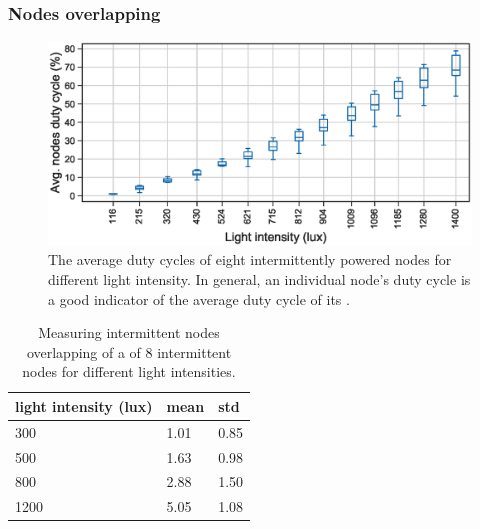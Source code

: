 \subsubsection{Nodes overlapping}
\begin{figure}[t]
		\centering
		\includegraphics[width=\columnwidth]{figures/cis_dutyCycle.eps}
		\caption{The average duty cycles of eight intermittently powered nodes for different light intensity. In general, an individual node's duty cycle is a good indicator of the average duty cycle of its \sys.}
		\label{fig:cis_nodes_dutyCycle}
\end{figure} 

\begin{table}
		\centering
		\caption{Measuring intermittent nodes overlapping of a \sys of 8 intermittent nodes for different light intensities.}
		\begin{tabular}{lll}
				\hline
				light intensity (lux) & mean & std    \\
				\hline
				300	                  & 1.01 & 0.85   \\
				500                   & 1.63 & 0.98   \\
				800                   & 2.88 & 1.50   \\
				1200                  & 5.05 & 1.08   \\
				\hline
		\end{tabular}
		\label{tab:clusters}
\end{table}


